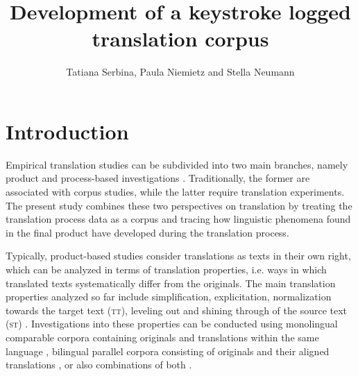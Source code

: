 \documentclass[output=paper]{LSP/langsci}
\author{Tatiana Serbina, Paula Niemietz and Stella Neumann}
\title{Development of a keystroke logged translation corpus}
\begin{document}
 
\section{Introduction} \label{sec:1:1}
Empirical translation studies can be subdivided into two main branches, namely product and process-based investigations \citep[see][]{Laviosa2002,Göpferich2008}. Traditionally, the former are associated with corpus studies, while the latter require translation experiments. The present study combines these two perspectives on translation by treating the translation process data as a corpus and tracing how linguistic phenomena found in the final product have developed during the translation process.

Typically, product-based studies consider translations as texts in their own right, which can be analyzed in terms of translation properties, i.e. ways in which translated texts systematically differ from the originals. The main translation properties analyzed so far include simplification, explicitation, normalization towards the target text (\textsc{tt}), leveling out \citep{Baker1996} and shining through of the source text (\textsc{st}) \citep{Teich2003}. Investigations into these properties can be conducted using monolingual comparable corpora containing originals and translations within the same language \citep[e.g.][]{Laviosa2002}, bilingual parallel corpora consisting of originals and their aligned translations \citep[e.g.][]{Becher2010}, or also combinations of both \citep{Culo2012,Hansen-Schirra2012}.
\end{document}
